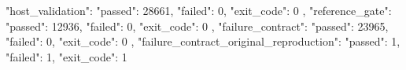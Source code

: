 \begin{codeblock}
{
  "host_validation": {
    "passed": 28661,
    "failed": 0,
    "exit_code": 0
  },
  "reference_gate": {
    "passed": 12936,
    "failed": 0,
    "exit_code": 0
  },
  "failure_contract": {
    "passed": 23965,
    "failed": 0,
    "exit_code": 0
  },
  "failure_contract_original_reproduction": {
    "passed": 1,
    "failed": 1,
    "exit_code": 1
  }
}
\end{codeblock}
